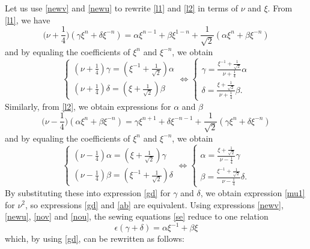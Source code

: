 \documentclass[11pt]{amsart}
\theoremstyle{definition}
\theoremstyle{remark}
\theoremstyle{plain}
\numberwithin{equation}{section}
\numberwithin{lemma}{section}
\numberwithin{definition}{section}
\numberwithin{proposition}{section}
\numberwithin{corollary}{section}
\numberwithin{theorem}{section}
\numberwithin{remark}{section}
\begin{document}
Let us use \eqref{newv} and \eqref{newu} to rewrite \eqref{l1} and \eqref{l2} in terms of $\nu$ and $\xi$.
From \eqref{l1}, we have
$$
\Big(\nu+\frac{1}{4}\Big)(\gamma \xi^n + \delta \xi^{-n})=\alpha \xi^{n-1} + \beta \xi^{1-n}+\frac{1}{\sqrt{2}}(\alpha \xi^n + \beta \xi^{-n})
$$
and by equaling the coefficients of $\xi^n$ and $\xi^{-n}$, we obtain 
\begin{equation}\label{gd}
 \begin{cases} 
      (\nu+\frac{1}{4})\gamma=(\xi^{-1}+\frac{1}{\sqrt{2}})\alpha
      \\
      (\nu+\frac{1}{4})\delta=(\xi+\frac{1}{\sqrt{2}})\beta
\end{cases}
\iff 
\begin{cases} 
      \gamma=\frac{\xi^{-1}+\frac{1}{\sqrt{2}}}{\nu+\frac{1}{4}}\alpha
      \\
      \delta=\frac{\xi+\frac{1}{\sqrt{2}}}{\nu+\frac{1}{4}}\beta.
\end{cases}
\end{equation}
Similarly, from \eqref{l2}, we obtain expressions for $\alpha$ and $\beta$ 
$$
\Big(\nu-\frac{1}{4}\Big)(\alpha \xi^n + \beta \xi^{-n})=\gamma \xi^{n+1} + \delta \xi^{-n-1}+\frac{1}{\sqrt{2}}(\gamma \xi^n + \delta \xi^{-n})
$$
and by equaling the coefficients of $\xi^n$ and $\xi^{-n}$, we obtain 
\begin{equation}\label{ab}
\begin{cases} 
      (\nu-\frac{1}{4})\alpha=(\xi+\frac{1}{\sqrt{2}})\gamma
      \\
      (\nu-\frac{1}{4})\beta=(\xi^{-1}+\frac{1}{\sqrt{2}})\delta
\end{cases}
\iff 
\begin{cases} 
      \alpha=\frac{\xi+\frac{1}{\sqrt{2}}}{\nu-\frac{1}{4}}\gamma
      \\
      \beta=\frac{\xi^{-1}+\frac{1}{\sqrt{2}}}{\nu-\frac{1}{4}}\delta.
\end{cases}
\end{equation}
By substituting these into expression \eqref{gd} for $\gamma$ and $\delta$, we obtain expression \eqref{mu1} for $\nu^2$, so expressions \eqref{gd} and \eqref{ab} are equivalent.
Using expressions \eqref{newv}, \eqref{newu}, \eqref{nov} and \eqref{nou}, the sewing equations \eqref{se}  reduce to one relation
\begin{equation}\label{nse12}
 \epsilon(\gamma+\delta)=\alpha\xi^{-1}+\beta\xi 
\end{equation}
which, by using \eqref{gd}, can be rewritten  as  follows:
\end{document}
